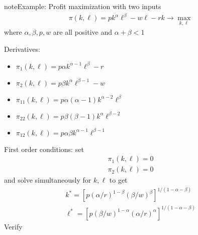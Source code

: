 \documentclass[letterpaper,10pt,english]{jupyterBook}
\begin{document}
\begin{sphinxadmonition}{note}{Example: Profit maximization with two inputs}
\begin{equation*}
\begin{split}
\pi(k, \ell) 
= p k^{\alpha} \ell^{\beta} - w \ell - r k
\rightarrow \max_{k, \ell}
\end{split}
\end{equation*}
\sphinxAtStartPar
where \( \alpha, \beta, p, w\) are all positive and \(\alpha + \beta < 1\)
\end{sphinxadmonition}

\sphinxAtStartPar
Derivatives:
\begin{itemize}
\item {} 
\sphinxAtStartPar
\(\pi_1(k, \ell) = p \alpha k^{\alpha-1} \ell^{\beta} - r\)

\item {} 
\sphinxAtStartPar
\(\pi_2(k, \ell) = p \beta k^{\alpha} \ell^{\beta-1} - w\)

\item {} 
\sphinxAtStartPar
\(\pi_{11}(k, \ell) = p \alpha(\alpha-1) k^{\alpha-2} \ell^{\beta}\)

\item {} 
\sphinxAtStartPar
\(\pi_{22}(k, \ell) = p \beta(\beta-1) k^{\alpha} \ell^{\beta-2}\)

\item {} 
\sphinxAtStartPar
\(\pi_{12}(k, \ell) = p \alpha \beta k^{\alpha-1} \ell^{\beta-1}\)

\end{itemize}

\sphinxAtStartPar
First order conditions: set
\begin{equation*}
\begin{split}
\pi_1(k, \ell) = 0
\\
\pi_2(k, \ell) = 0
\end{split}
\end{equation*}
\sphinxAtStartPar
and solve simultaneously for \(k, \ell\) to get
\begin{equation*}
\begin{split}
k^* =
\left[ 
p (\alpha/r)^{1 - \beta}  (\beta/w)^{\beta}
\right]^{1 / (1 - \alpha - \beta)}
\\
\ell^* =
\left[ 
p (\beta/w)^{1 - \alpha}  (\alpha/r)^{\alpha}
\right]^{1 / (1 - \alpha - \beta)}
\end{split}
\end{equation*}
\sphinxAtStartPar
{} Verify
\end{document}

